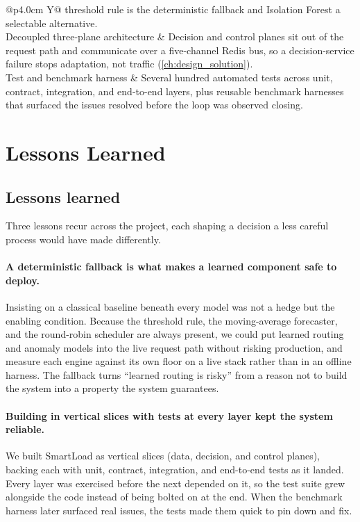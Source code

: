 \begin{table}[H]
\begin{tabularx}{\linewidth}{@{}p{4.0cm} Y@{}}
        threshold rule is the deterministic fallback and Isolation Forest
        \cite{liu2008isolationforest} a selectable alternative. \\
    Decoupled three-plane architecture
      & Decision and control planes sit out of the request path and communicate over a
        five-channel Redis bus, so a decision-service failure stops adaptation, not
        traffic (\cref{ch:design_solution}). \\
    Test and benchmark harness
      & Several hundred automated tests across unit, contract, integration, and
        end-to-end layers, plus reusable benchmark harnesses that surfaced the issues
        resolved before the loop was observed closing. \\
    \bottomrule
  \end{tabularx}
\end{table}

\section{Lessons Learned}
\label{conc:lessons}

\subsection{Lessons learned}
\label{conc:lessons-learned}

Three lessons recur across the project, each shaping a decision a less careful process
would have made differently.

\paragraph{A deterministic fallback is what makes a learned component safe to deploy.}
Insisting on a classical baseline beneath every model was not a hedge but the enabling
condition. Because the threshold rule, the moving-average forecaster, and the round-robin
scheduler are always present, we could put learned routing and anomaly models into the
live request path without risking production, and measure each engine against its own
floor on a live stack rather than in an offline harness. The fallback turns ``learned
routing is risky'' from a reason not to build the system into a property the system
guarantees.

\paragraph{Building in vertical slices with tests at every layer kept the system
reliable.} We built SmartLoad as vertical slices (data, decision, and control planes),
backing each with unit, contract, integration, and end-to-end tests as it landed. Every
layer was exercised before the next depended on it, so the test suite grew alongside the
code instead of being bolted on at the end. When the benchmark harness later surfaced
real issues, the tests made them quick to pin down and fix.


